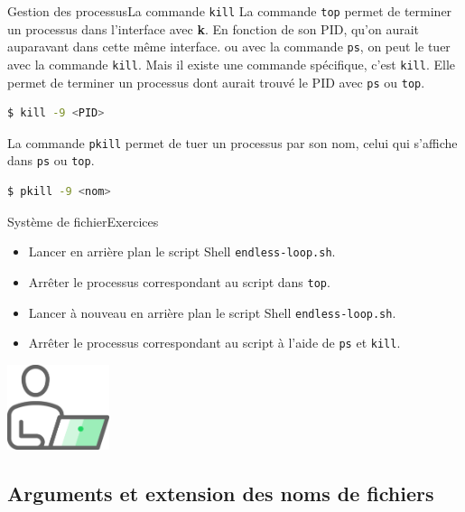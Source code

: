 \documentclass{beamer}
\begin{document}
    \begin{frame}[fragile]{Gestion des processus}{La commande \lstinline{kill}}
        La commande \lstinline{top} permet de terminer un processus dans l'interface avec \textbf{k}.
        En fonction de son PID, qu'on aurait auparavant dans cette même interface.
        ou avec la commande \lstinline{ps}, on peut le tuer avec la commande \lstinline{kill}.
        \bigbreak
        Mais il existe une commande spécifique, c'est \lstinline{kill}.
        Elle permet de terminer un processus dont aurait trouvé le PID avec \lstinline{ps} ou \lstinline{top}.
        \begin{lstlisting}[language=bash]
$ kill -9 <PID>
        \end{lstlisting}
        \bigbreak
        La commande \lstinline{pkill} permet de tuer un processus par son nom, celui qui s'affiche dans \lstinline{ps} ou \lstinline{top}.
        \begin{lstlisting}[language=bash]
$ pkill -9 <nom>
        \end{lstlisting}
    \end{frame}

    \begin{frame}{Système de fichier}{Exercices \execcounterdispinc{}}
        \begin{itemize}
            \item Lancer en arrière plan le script Shell \lstinline{endless-loop.sh}.
            \item Arrêter le processus correspondant au script dans \lstinline{top}.
            \item Lancer à nouveau en arrière plan le script Shell \lstinline{endless-loop.sh}.
            \item Arrêter le processus correspondant au script à l'aide de  \lstinline{ps} et \lstinline{kill}.
        \end{itemize}
        \bigbreak
        \centering
        \includegraphics[width=3cm]{image/guy-in-front-of-desktop}
    \end{frame}

    \subsection{Arguments et extension des noms de fichiers}\label{subsec:arguments-extension}
\end{document}
